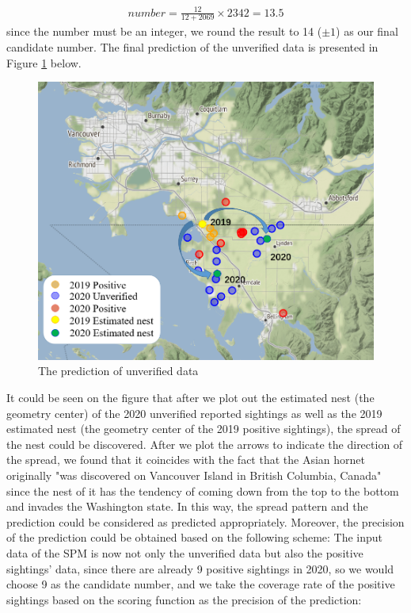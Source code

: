 \documentclass{mcmthesis}
\begin{document}
	\begin{align*}
		number = \frac{12}{12+2069}\times 2342 = 13.5 
	\end{align*}
	since the number must be an integer, we round the result to 14 ($\pm 1$) as our final candidate number. The final prediction of the unverified data is presented in Figure \ref{marked} below.
	\begin{figure}[H]
		\centering
		\includegraphics[scale=0.5]{marked.png}
		\caption{The prediction of unverified data}
		\label{marked}
	\end{figure}
	It could be seen on the figure that after we plot out the estimated nest (the geometry center) of the 2020 unverified reported sightings as well as the 2019 estimated nest (the geometry center of the 2019 positive sightings), the spread of the nest could be discovered. After we plot the arrows to indicate the direction of the spread, we found that it coincides with the fact that the Asian hornet originally "was discovered on Vancouver Island in British Columbia, Canada" since the nest of it has the tendency of coming down from the top to the bottom and invades the Washington state. In this way, the spread pattern and the prediction could be considered as predicted appropriately. Moreover, the precision of the prediction could be obtained based on the following scheme: The input data of the SPM is now not only the unverified data but also the positive sightings' data, since there are already 9 positive sightings in 2020, so we would choose 9 as the candidate number, and we take the coverage rate of the positive sightings based on the scoring function as the precision of the prediction:
\end{document}
